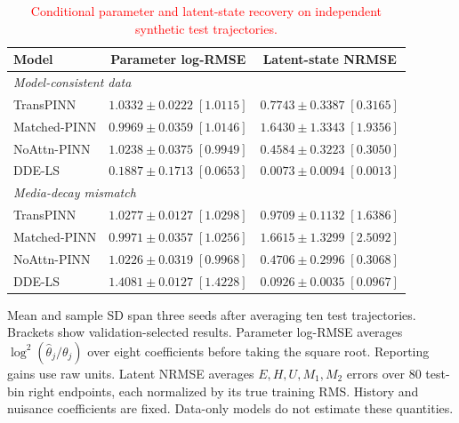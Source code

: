 \begin{table}[t]
\centering
\caption{\textcolor{red}{Conditional parameter and latent-state recovery on independent synthetic test trajectories.}}
\label{tab:synthetic_recovery}
\footnotesize
\setlength{\tabcolsep}{4pt}
\renewcommand{\arraystretch}{1.08}
\begin{tabular*}{\textwidth}{@{\extracolsep{\fill}}lcc@{}}
\toprule
Model & Parameter log-RMSE & Latent-state NRMSE \\
\midrule
\multicolumn{3}{l}{\textit{Model-consistent data}} \\
TransPINN & $1.0332\pm0.0222\;[1.0115]$ & $0.7743\pm0.3387\;[0.3165]$ \\
Matched-PINN & $0.9969\pm0.0359\;[1.0146]$ & $1.6430\pm1.3343\;[1.9356]$ \\
NoAttn-PINN & $1.0238\pm0.0375\;[0.9949]$ & $0.4584\pm0.3223\;[0.3050]$ \\
DDE-LS & $0.1887\pm0.1713\;[0.0653]$ & $0.0073\pm0.0094\;[0.0013]$ \\
\midrule
\multicolumn{3}{l}{\textit{Media-decay mismatch}} \\
TransPINN & $1.0277\pm0.0127\;[1.0298]$ & $0.9709\pm0.1132\;[1.6386]$ \\
Matched-PINN & $0.9971\pm0.0357\;[1.0256]$ & $1.6615\pm1.3299\;[2.5092]$ \\
NoAttn-PINN & $1.0226\pm0.0319\;[0.9968]$ & $0.4706\pm0.2996\;[0.3068]$ \\
DDE-LS & $1.4081\pm0.0127\;[1.4228]$ & $0.0926\pm0.0035\;[0.0967]$ \\
\bottomrule
\end{tabular*}
\par\smallskip
\begin{minipage}{\textwidth}\footnotesize Mean and sample SD span three seeds after averaging ten test trajectories. Brackets show validation-selected results. Parameter log-RMSE averages $\log^2(\widehat\theta_j/\theta_j)$ over eight coefficients before taking the square root. Reporting gains use raw units. Latent NRMSE averages $E,H,U,M_1,M_2$ errors over 80 test-bin right endpoints, each normalized by its true training RMS. History and nuisance coefficients are fixed. Data-only models do not estimate these quantities.\end{minipage}
\end{table}
